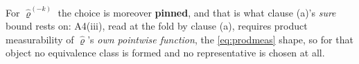 \begin{definition}
\begin{enumerate}
\begin{enumerate}
For $\hat\varrho^{(-k)}$ the choice is moreover \textbf{pinned}, and that is what clause \textup{(a)}'s
\emph{sure} bound rests on: A4(iii), read at the fold by clause \textup{(a)}, requires product
measurability of $\hat\varrho$'s \emph{own pointwise function}, the \eqref{eq:prodmeas} shape, so for
that object no equivalence class is formed and no representative is chosen at all.


\end{enumerate}
\end{enumerate}
\end{definition}

